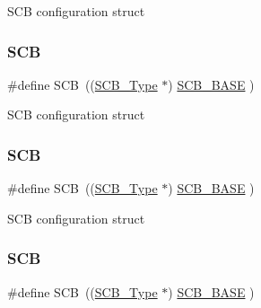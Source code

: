 S\+CB configuration struct \mbox{\label{group___c_m_s_i_s__core__base_gaaaf6477c2bde2f00f99e3c2fd1060b01}} 
\subsubsection{\texorpdfstring{S\+CB}{SCB}\hspace{0.1cm}{\footnotesize\ttfamily [3/7]}}
{\footnotesize\ttfamily \#define S\+CB~((\mbox{\hyperlink{struct_s_c_b___type}{S\+C\+B\+\_\+\+Type}}       $\ast$)     \mbox{\hyperlink{group___c_m_s_i_s__core__base_gad55a7ddb8d4b2398b0c1cfec76c0d9fd}{S\+C\+B\+\_\+\+B\+A\+SE}}      )}

S\+CB configuration struct \mbox{\label{group___c_m_s_i_s__core__base_gaaaf6477c2bde2f00f99e3c2fd1060b01}} 
\subsubsection{\texorpdfstring{S\+CB}{SCB}\hspace{0.1cm}{\footnotesize\ttfamily [4/7]}}
{\footnotesize\ttfamily \#define S\+CB~((\mbox{\hyperlink{struct_s_c_b___type}{S\+C\+B\+\_\+\+Type}}       $\ast$)     \mbox{\hyperlink{group___c_m_s_i_s__core__base_gad55a7ddb8d4b2398b0c1cfec76c0d9fd}{S\+C\+B\+\_\+\+B\+A\+SE}}      )}

S\+CB configuration struct \mbox{\label{group___c_m_s_i_s__core__base_gaaaf6477c2bde2f00f99e3c2fd1060b01}} 
\subsubsection{\texorpdfstring{S\+CB}{SCB}\hspace{0.1cm}{\footnotesize\ttfamily [5/7]}}
{\footnotesize\ttfamily \#define S\+CB~((\mbox{\hyperlink{struct_s_c_b___type}{S\+C\+B\+\_\+\+Type}}       $\ast$)     \mbox{\hyperlink{group___c_m_s_i_s__core__base_gad55a7ddb8d4b2398b0c1cfec76c0d9fd}{S\+C\+B\+\_\+\+B\+A\+SE}}      )}

